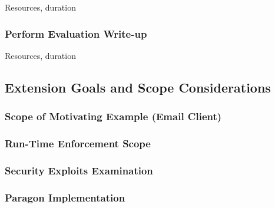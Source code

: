 Resources, duration

\subsubsection{Perform Evaluation Write-up}

Resources, duration

\subsection{Extension Goals and Scope Considerations}
	
	\subsubsection{Scope of Motivating Example (Email Client)}
	
	\subsubsection{Run-Time Enforcement Scope}
	
	\subsubsection{Security Exploits Examination}
	
	\subsubsection{Paragon Implementation}